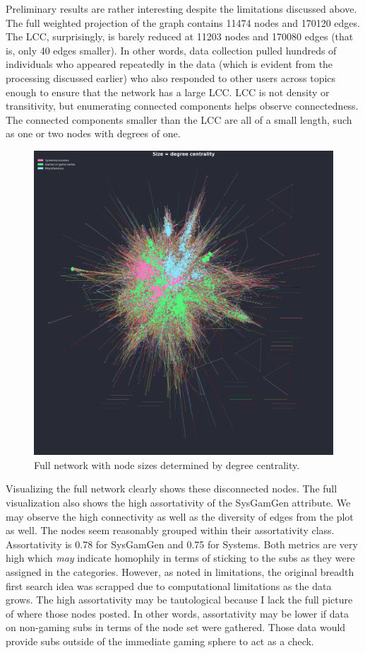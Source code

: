 \documentclass[12pt, a4paper]{article}
\begin{document}
Preliminary results are rather interesting despite the limitations discussed above. The full weighted projection of the graph contains 11474 nodes and 170120 edges. The LCC, surprisingly, is barely reduced at 11203 nodes and 170080 edges (that is, only 40 edges smaller). In other words, data collection pulled hundreds of individuals who appeared repeatedly in the data (which is evident from the processing discussed earlier) who also responded to other users across topics enough to ensure that the network has a large LCC. LCC is not density or transitivity, but enumerating connected components helps observe connectedness. The connected components smaller than the LCC are all of a small length, such as one or two nodes with degrees of one.

\begin{figure}[ht!]
  \centering
  \includegraphics[width=\textwidth]{network_degcent.png}
  \caption{Full network with node sizes determined by degree centrality.}
  \label{fig:fullnet}
\end{figure}

Visualizing the full network clearly shows these disconnected nodes. The full visualization also shows the high assortativity of the SysGamGen attribute. We may observe the high connectivity as well as the diversity of edges from the plot as well. The nodes seem reasonably grouped within their assortativity class. Assortativity is 0.78 for SysGamGen and 0.75 for Systems. Both metrics are very high which \textit{may} indicate homophily in terms of sticking to the subs as they were assigned in the categories. However, as noted in limitations, the original breadth first search idea was scrapped due to computational limitations as the data grows. The high assortativity may be tautological because I lack the full picture of where those nodes posted. In other words, assortativity may be lower if data on non-gaming subs in terms of the node set were gathered. Those data would provide subs outside of the immediate gaming sphere to act as a check.
\end{document}
